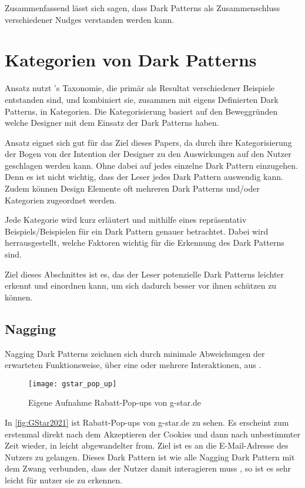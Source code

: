 \documentclass[conference,compsoc,final,a4paper]{IEEEtran}
\begin{document}
Zusammenfassend lässt sich sagen, dass Dark Patterns als Zusammenschluss verschiedener Nudges verstanden werden kann.

\section{Kategorien von Dark Patterns}
\citeauthor{Gray_2018} \autocite{Gray_2018} Ansatz nutzt \citeauthor{Brignull}'s \autocite{Brignull} Taxonomie, die primär als Resultat verschiedener Beispiele entstanden sind, und kombiniert sie, zusammen mit eigens Definierten Dark Patterns, in Kategorien. Die Kategorisierung basiert auf den Beweggründen welche Designer mit dem Einsatz der Dark Patterns haben.

\citeauthor{Gray_2018} \autocite{Gray_2018} Ansatz eignet sich gut für das Ziel dieses Papers, da durch ihre Kategorisierung der Bogen von der Intention der Designer zu den Auswirkungen auf den Nutzer geschlagen werden kann. Ohne dabei auf jedes einzelne Dark Pattern einzugehen. Denn es ist nicht wichtig, dass der Leser jedes Dark Pattern auswendig kann. Zudem können Design Elemente oft mehreren Dark Patterns und/oder Kategorien zugeordnet werden.

Jede Kategorie wird kurz erläutert und mithilfe eines repräsentativ Beispiels/Beispielen für ein Dark Pattern genauer betrachtet. Dabei wird herrausgestellt, welche Faktoren wichtig für die Erkennung des Dark Patterns sind.

Ziel dieses Abschnittes ist es, das der Leser potenzielle Dark Patterns leichter erkennt und einordnen kann, um sich dadurch besser vor ihnen schützen zu können.
\subsection{Nagging}
Nagging Dark Patterns zeichnen sich durch minimale Abweichungen der erwarteten Funktionsweise, über eine oder mehrere Interaktionen, aus \autocite{Gray_2018}.

\begin{figure}[!ht]
  \centering
  \texttt{[image: gstar\_pop\_up]}
  \caption{Eigene Aufnahme Rabatt-Pop-ups von g-star.de~\autocite{GStar2021}}
  \label{fig:GStar2021}
\end{figure}

In \autoref{fig:GStar2021} ist Rabatt-Pop-ups von g-star.de zu sehen. Es erscheint zum erstenmal direkt nach dem Akzeptieren der Cookies und dann nach unbestimmter Zeit wieder, in leicht abgewandelter from. Ziel ist es an die E-Mail-Adresse des Nutzers zu gelangen. Dieses Dark Pattern ist wie alle Nagging Dark Pattern mit dem Zwang verbunden, dass der Nutzer damit interagieren muss \autocite{Gray_2018}, so ist es sehr leicht für nutzer sie zu erkennen.
\end{document}
